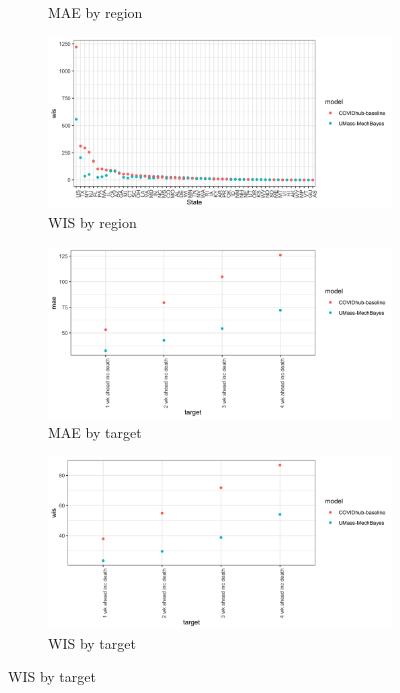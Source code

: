 \documentclass[11pt]{amsart}
\begin{document}
\begin{figure}
\begin{subfigure}{.5\textwidth}
    \caption{MAE by region}
\end{subfigure}%
\begin{subfigure}{.5\textwidth}
  \centering
    \includegraphics[scale=.1]{wis_results_by_region_inc.png}
    \caption{WIS by region}
\end{subfigure}
\begin{subfigure}{.5\textwidth}
  \centering
    \includegraphics[scale=.1]{mae_results_by_target_inc.png}
    \caption{MAE by target}
\end{subfigure}%
\begin{subfigure}{.5\textwidth}
  \centering
    \includegraphics[scale=.1]{wis_results_by_target_inc.png}
    \caption{WIS by target}
\end{subfigure}%

\end{figure}
\end{document}
